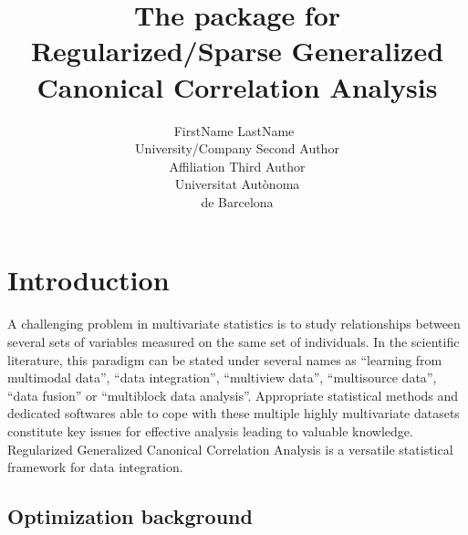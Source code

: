 \documentclass[
]{jss}
\author{
FirstName
LastName~\orcidlink{0000-0000-0000-0000}\\University/Company \And Second
Author\\Affiliation \AND Third Author\\Universitat Autònoma\\
de Barcelona
}
\title{The \pkg{RGCCA} package for Regularized/Sparse Generalized
Canonical Correlation Analysis}
\begin{document}
\newcommand{\ma}[1]{\ensuremath{\mathbf{#1}}}
\newcommand{\sign}{\ensuremath{\mathrm{sign}}}
\newcommand{\mat}[1]{\textbf{\text{#1}}}
\newcommand{\cov}{\ensuremath{\text{cov}}}
\newcommand{\var}{\ensuremath{\mathrm{var}}}
\newcommand{\tr}{\ensuremath{\mathrm{tr}}}
\newcommand{\argmin}{\ensuremath{\mathrm{argmin}}}
\newcommand{\argmax}{\ensuremath{\mathrm{argmax}}}
\newcommand{\X}{\mathbf{X}}
\newcommand{\A}{\mathbf{A}}
\newcommand{\Q}{\mathbf{Q}}
\newcommand{\M}{\mathbf{M}}
\newcommand{\C}{\mathbf{C}}
\newcommand{\mbc}{\mathbf{c}}
\newcommand{\I}{\mathbf{I}}
\newcommand{\mbP}{\mathbf{P}}
\newcommand{\mba}{\mathbf{a}}
\newcommand{\z}{\mathbf{z}}
\newcommand{\w}{\mathbf{w}}
\newcommand{\y}{\mathbf{y}}
\newcommand{\mbb}{\mathbf{b}}
\newcommand{\Xu}{\underline{\mathbf{X}}}
\newcommand{\Pu}{\underline{\mathbf{P}}}
\newcommand{\x}{\mathbf{x}}
\newcommand{\K}{\mathbf{K}}
\newcommand{\mcH}{\mathcal{H}}
\newcommand{\bsx}{\boldsymbol{x}}
\newcommand{\bsxi}{\boldsymbol{\xi}}
\newcommand{\bsa}{\boldsymbol{\alpha}}

\newtheorem{theorem}{theorem}[section]%
\newtheorem{lemma}[theorem]{Lemma}
\newtheorem{proposition}[theorem]{Proposition}
\newtheorem{corollary}[theorem]{Corollary}
\newtheorem{remark}[theorem]{Remark}

\hypertarget{introduction}{%
\section{Introduction}\label{introduction}}

A challenging problem in multivariate statistics is to study
relationships between several sets of variables measured on the same set
of individuals. In the scientific literature, this paradigm can be
stated under several names as ``learning from multimodal data'', ``data
integration'', ``multiview data'', ``multisource data'', ``data fusion''
or ``multiblock data analysis''. Appropriate statistical methods and
dedicated softwares able to cope with these multiple highly multivariate
datasets constitute key issues for effective analysis leading to
valuable knowledge. Regularized Generalized Canonical Correlation
Analysis is a versatile statistical framework for data integration.

\hypertarget{optimization-background}{%
\subsection{Optimization background}\label{optimization-background}}
\end{document}
